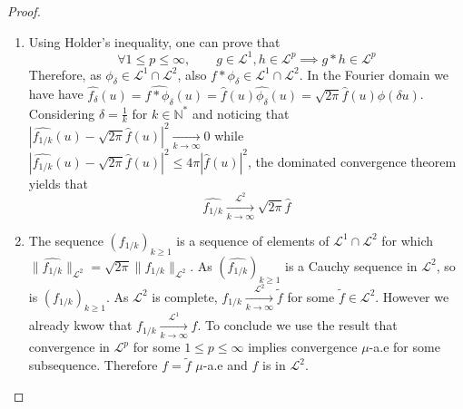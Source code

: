 \begin{proof}
\begin{enumerate}
    \item
      Using Holder's inequality, one can prove that
      \begin{equation*}
	\forall 1 \leq p\leq \infty, \qquad g \in \mathcal{L}^1, h \in \mathcal{L}^p \implies  g*h \in \mathcal{L}^p
      \end{equation*}
      Therefore, as $\phi_{\delta} \in \mathcal{L}^1 \cap \mathcal{L}^2$, also $f*\phi_{\delta} \in \mathcal{L}^1 \cap 
      \mathcal{L}^2$.  In the Fourier domain we have have $\hat{f_{\delta}}(u) = \widehat{f*\phi_{\delta}}(u) = 
      \hat{f}(u)\hat{\phi_{\delta}}(u) = \sqrt{2\pi} \hat{f}(u) \phi(\delta u)$.  Considering $\delta = \frac{1}{k}$ for 
      $k \in \mathbb{N}^*$ and noticing that $|\widehat{f_{1/k}}(u) - \sqrt{2\pi} \hat{f}(u)|^2 \xrightarrow[k \to 
      \infty]{} 0$ while $|\widehat{f_{1/k}}(u) - \sqrt{2\pi} \hat{f}(u)|^2 \leq 4\pi |\hat{f}(u)|^2$, the dominated 
      convergence theorem yields that \begin{equation*}
	\widehat{f_{1/k}} \xrightarrow[k \to \infty]{\mathcal{L}^2}  \sqrt{2\pi} \hat{f}
      \end{equation*}

    \item
      The sequence ${\left(f_{1/k}\right)}_{k \geq 1}$ is a sequence of elements of $\mathcal{L}^1\cap\mathcal{L}^2$ for 
      which $\|\widehat{f_{1/k}}\|_{\mathcal{L}^2} = \sqrt{2\pi} \|f_{1/k}\|_{\mathcal{L}^2}$. As 
      ${\left(\widehat{f_{1/k}}\right)}_{k \geq 1}$ is a Cauchy sequence in $\mathcal{L}^2$, so is 
      ${\left(f_{1/k}\right)}_{k \geq 1}$. As $\mathcal{L}^2$ is complete, $f_{1/k} \xrightarrow[k \to 
      \infty]{\mathcal{L}^2} \tilde{f}$ for some $\tilde{f} \in \mathcal{L}^2$. However we already kwow that $f_{1/k} 
      \xrightarrow[k \to \infty]{\mathcal{L}^1} f$.  To conclude we use the result that convergence in $\mathcal{L}^p$ 
      for some $1 \leq p \leq \infty$ implies convergence $\mu$-a.e for some subsequence.  Therefore $f=\tilde{f}$ 
      $\mu$-a.e and $f$ is in $\mathcal{L}^2$.
  \end{enumerate}
\end{proof}
 
